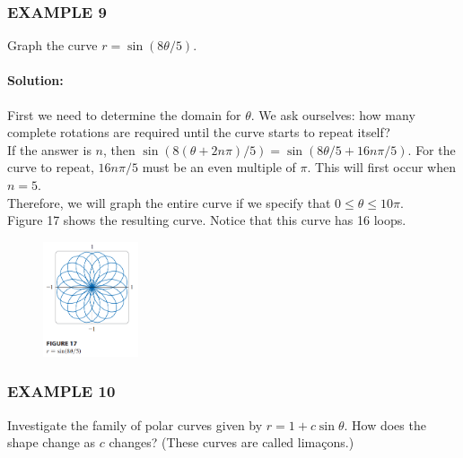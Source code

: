 \documentclass{article}
\begin{document}
\subsubsection*{EXAMPLE 9}
Graph the curve $r=\sin(8\theta/5)$.

\paragraph{Solution:} First we need to determine the domain for $\theta$. We ask ourselves: how many complete rotations are required until the curve starts to repeat itself? 
\\If the answer is $n$, then $\sin(8(\theta+2n\pi)/5) = \sin(8\theta/5 + 16n\pi/5)$. For the curve to repeat, $16n\pi/5$ must be an even multiple of $\pi$. This will first occur when $n=5$. 
\\Therefore, we will graph the entire curve if we specify that $0 \le \theta \le 10\pi$. 
\\Figure 17 shows the resulting curve. Notice that this curve has 16 loops.

\begin{figure}[htbp]
    \centering
    \includegraphics[width=0.25\textwidth]{graph41.png}
\end{figure}

\subsubsection*{EXAMPLE 10}
Investigate the family of polar curves given by $r=1+c\sin\theta$. How does the shape change as $c$ changes? (These curves are called limaçons.)
\end{document}
